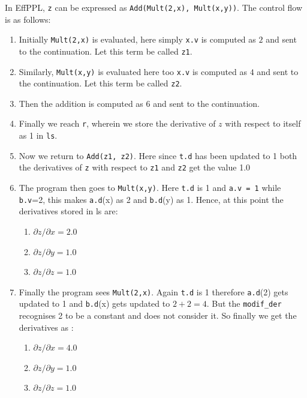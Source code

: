 \documentclass[a4paper,11pt]{article}
\theoremstyle{mytheor}
\begin{document}
    In EffPPL, \lstinline{z} can be expressed as \lstinline{Add(Mult(2,x), Mult(x,y))}. The control flow is as follows:
    \begin{enumerate}
        \item Initially \lstinline{Mult(2,x)} is evaluated, here simply \lstinline{x.v} is computed as $2$ and sent to the continuation. Let this term be called \lstinline{z1}.
        \item Similarly, \lstinline{Mult(x,y)} is evaluated here too \lstinline{x.v} is computed as $4$ and sent to the continuation. Let this term be called \lstinline{z2}.
        \item Then the addition is computed as $6$ and sent to the continuation.
        \item Finally we reach \lstinline{r}, wherein we store the derivative of $z$ with respect to itself as 1 in \lstinline{ls}.
        \item Now we return to \lstinline{Add(z1, z2)}. Here since \lstinline{t.d} has been updated to 1 both the derivatives of \lstinline{z} with respect to \lstinline{z1} and \lstinline{z2} get the value 1.0
        \item The program then goes to \lstinline{Mult(x,y)}. Here \lstinline{t.d} is 1 and \lstinline{a.v = 1} while \lstinline{b.v}=2, this makes \lstinline{a.d}(x) as 2 and \lstinline{b.d}(y) as 1. Hence, at this point the derivatives stored in ls are:
        \begin{enumerate}
            \item $\partial z / \partial x = 2.0$
            \item $\partial z / \partial y = 1.0$
            \item $\partial z / \partial z = 1.0$
        \end{enumerate}
        \item Finally the program sees \lstinline{Mult(2,x)}. Again \lstinline{t.d} is 1 therefore \lstinline{a.d}(2) gets updated to 1 and \lstinline{b.d}(x) gets updated to $2+2 = 4$. But the \lstinline{modif_der} recognises 2 to be a constant and does not consider it. So finally we get the derivatives as :
        \begin{enumerate}
            \item $\partial z / \partial x = 4.0$
            \item $\partial z / \partial y = 1.0$
            \item $\partial z / \partial z = 1.0$
        \end{enumerate}
    \end{enumerate}
    
\end{document}
